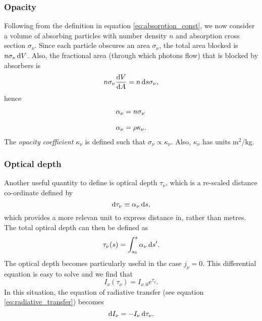 \subsubsection{Opacity}
Following from the definition in equation \ref{eq:absorption_const}, we now consider a volume of absorbing particles with number density $n$ and absorption cross section $\sigma_\nu$.
 Since each particle obscures an area $\sigma_\nu$, the total area blocked is $n\sigma_\nu\mathop{}\!\mathrm{d} V$.
 Also, the fractional area (through which photons flow) that is blocked by absorbers is
$$ n \sigma_\nu \frac{\mathop{}\!\mathrm{d} V}{\mathop{}\!\mathrm{d} A} = n \mathop{}\!\mathrm{d} s \sigma_\nu, $$
hence
% 
\begin{align*}
	\alpha_\nu &= n \sigma_\nu	
	\linedrop
	\alpha_\nu &= \rho \kappa_\nu.
\end{align*}
%
The \emph{opacity coefficient} $\kappa_\nu$ is defined such that $\sigma_\nu \propto \kappa_\nu$. Also, $\kappa_\nu$ has units m$^2$/kg.
\par 
\subsubsection{Optical depth}
Another useful quantity to define is optical depth $\tau_\nu$, which is a re-scaled distance co-ordinate defined by
$$ \mathop{}\!\mathrm{d} \tau_\nu \equiv \alpha_\nu \mathop{}\!\mathrm{d} s, $$
which provides a more relevan unit to express distance in, rather than metres.
 The total optical depth can then be defined as
$$ \tau_\nu (s) = \int_{s_0}^{s} \alpha_\nu \mathop{}\!\mathrm{d} s^\prime. $$
The optical depth becomes particularly useful in the case $j_\nu = 0$.
This differential equation is easy to solve and we find that
%
\begin{equation}
I_\nu (\tau_\nu) = I_{\nu,0} e^{\tau_\nu}.
\end{equation}
%
 In this situation, the equation of radiative transfer (see equation \ref{eq:radiative_transfer}) becomes
$$ \mathop{}\!\mathrm{d} I_\nu = - I_\nu \mathop{}\!\mathrm{d} \tau_\nu. $$







 
 
 